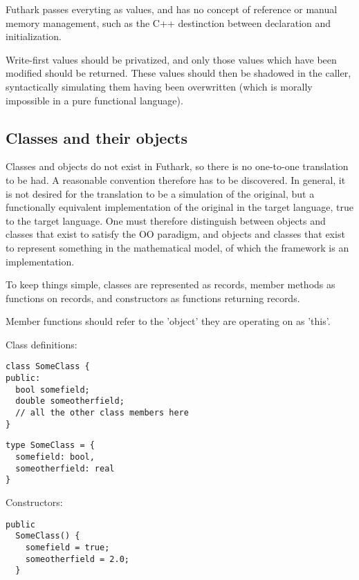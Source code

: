 Futhark passes everyting as values, and has no concept of reference or manual memory management, such as the C++ destinction between declaration and initialization.

Write-first values should be privatized, and only those values which have been modified should be returned. These values should then be shadowed in the caller, syntactically simulating them having been overwritten (which is morally impossible in a pure functional language).



\subsection{Classes and their objects}
Classes and objects do not exist in Futhark, so there is no one-to-one translation to be had. A reasonable convention therefore has to be discovered. In general, it is not desired for the translation to be a simulation of the original, but a functionally equivalent implementation of the original in the target language, true to the target language. One must therefore distinguish between objects and classes that exist to satisfy the OO paradigm, and objects and classes that exist to represent something in the mathematical model, of which the framework is an implementation.

To keep things simple, classes are represented as records, member methods as functions on records, and constructors as functions returning records.

Member functions should refer to the 'object' they are operating on as 'this'.


\newpage

Class definitions:
\begin{verbatim}
class SomeClass {
public:
  bool somefield;
  double someotherfield;
  // all the other class members here
}
\end{verbatim}

\begin{verbatim}
type SomeClass = {
  somefield: bool,
  someotherfield: real
}
\end{verbatim}


Constructors:
\begin{verbatim}
public
  SomeClass() {
    somefield = true;
    someotherfield = 2.0;
  }
\end{verbatim}

